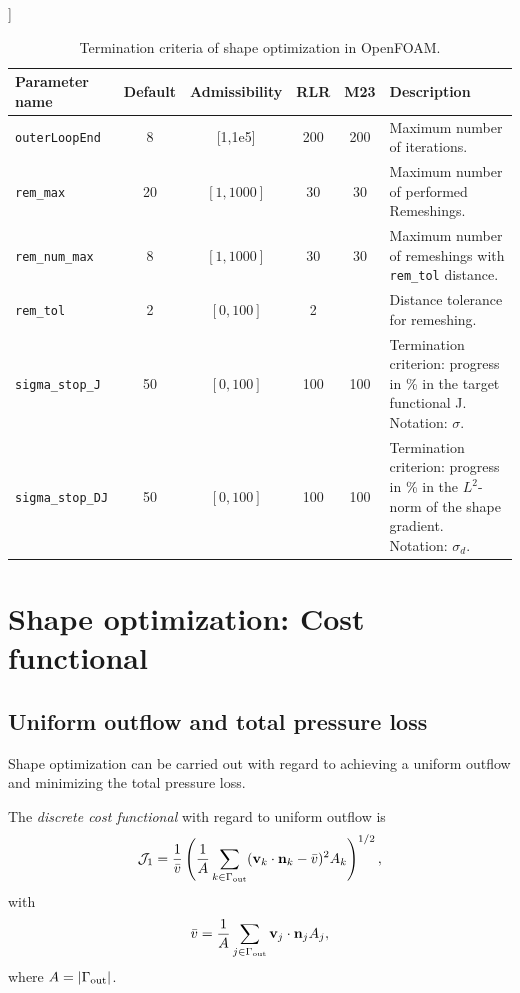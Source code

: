 \documentclass[a4paper,oneside]{book}
\numberwithin{equation}{section}
\begin{document}
\begin{table}[!htbp]]
    \begin{tabular}{|l|c|c|c|c|p{7.5cm}|}
        \hline 
        \cellcolor{light-gray}\textbf{Parameter name} & \cellcolor{light-gray}\textbf{Default} & \cellcolor{light-gray}\textbf{Admissibility} & \cellcolor{light-gray}\textbf{RLR} & \cellcolor{light-gray}\textbf{M23} & \cellcolor{light-gray}\textbf{Description} \\
        \hline 
        \texttt{outerLoopEnd} & 8 & [1,1e5] & 200 & 200 & Maximum number of iterations. \\ 
        \hline 
        \verb|rem_max| & 20 & $\left[1,1000\right]$ & 30 & 30 & Maximum number of performed Remeshings. \\ 
        \hline 
        \verb|rem_num_max| & 8 & $\left[1,1000\right]$ & 30 & 30 & Maximum number of remeshings
        with \verb|rem_tol| distance. \\ 
        \hline 
        \verb|rem_tol| & 2 & $\left[0,100\right]$ & 2 &  & Distance tolerance for remeshing. \\ 
        \hline 
        \verb|sigma_stop_J| & 50 & $\left[0,100\right]$ & 100 & 100 & Termination criterion: progress in \% in the target functional J. Notation: $\sigma$. \\ 
        \hline 
        \verb|sigma_stop_DJ| & 50 & $\left[0,100\right]$ & 100 & 100 & Termination criterion: progress in \% in the $L^2$-norm of the shape gradient. Notation: $\sigma _d$. \\ 
        \hline 
    \end{tabular}    
    \caption{Termination criteria of shape optimization in OpenFOAM.}
\end{table}

\section{Shape optimization: Cost functional}

\subsection{Uniform outflow and total pressure loss}
Shape optimization can be carried out with regard to achieving a uniform outflow and minimizing the total pressure loss.

The \textit{discrete cost functional} with regard to uniform outflow is
\begin{align}
\label{discrete cost functional J1}
\mathcal{J}_1 = \frac{1}{\bar{v}} \left(\frac{1}{A}\sum_{k\in\Gamma_{\rm out}} ({\bf v}_k\cdot{\bf n}_k - \bar{v})^2 A_k\right)^{1/2},
\end{align}
with
\begin{align}
\bar{v} = \frac{1}{A}\sum_{j\in\Gamma_{\rm out}} {\bf v}_j\cdot{\bf n}_jA_j,
\end{align}
where $A = |\Gamma_{\rm out}|$.
\end{document}
